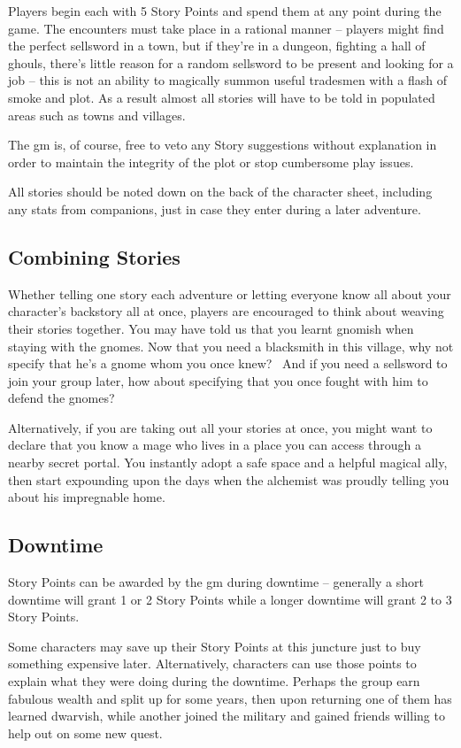 \documentclass[titlepage,a4paper,openany]{book}
\begin{document}
\begin{multicols}{2}

Players begin each with 5 Story Points and spend them at any point during the game. The encounters must take place in a rational manner -- players might find the perfect sellsword in a town, but if they're in a dungeon, fighting a hall of ghouls, there's little reason for a random sellsword to be present and looking for a job -- this is not an ability to magically summon useful tradesmen with a flash of smoke and plot. As a result almost all stories will have to be told in populated areas such as towns and villages.

The \gls{gm} is, of course, free to veto any Story suggestions without explanation in order to maintain the integrity of the plot or stop cumbersome play issues.

All stories should be noted down on the back of the character sheet, including any stats from companions, just in case they enter during a later adventure.

\subsection{Combining Stories}

Whether telling one story each adventure or letting everyone know all about your character's backstory all at once, players are encouraged to think about weaving their stories together. You may have told us that you learnt gnomish when staying with the gnomes. Now that you need a blacksmith in this village, why not specify that he's a gnome whom you once knew? \ And if you need a sellsword to join your group later, how about specifying that you once fought with him to defend the gnomes?

Alternatively, if you are taking out all your stories at once, you might want to declare that you know a mage who lives in a place you can access through a nearby secret portal. You instantly adopt a safe space and a helpful magical ally, then start expounding upon the days when the alchemist was proudly telling you about his impregnable home.


\subsection{Downtime}

Story Points can be awarded by the \gls{gm} during \gls{downtime} -- generally a short downtime will grant 1 or 2 Story Points while a longer downtime will grant 2 to 3 Story Points.

Some characters may save up their Story Points at this juncture just to buy something expensive later.  Alternatively, characters can use those points to explain what they were doing during the \gls{downtime}.  Perhaps the group earn fabulous wealth and split up for some years, then upon returning one of them has learned dwarvish, while another joined the military and gained friends willing to help out on some new quest.

\end{multicols}
\end{document}
